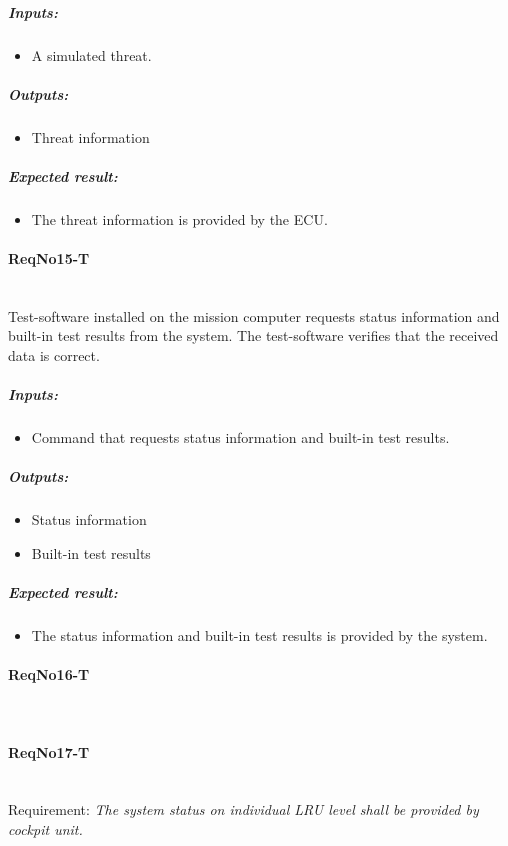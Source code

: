 	\subparagraph{Inputs:}
	\begin{itemize}
	\item A simulated threat. 
	\end{itemize}
	\subparagraph{Outputs:}
	\begin{itemize}
	\item Threat information
	\end{itemize}
	\subparagraph{Expected result:}
	\begin{itemize}
	\item The threat information is provided by the ECU.
	\end{itemize}
	

\paragraph{ReqNo15-T}\mbox{}\\ %
Test-software installed on the mission computer requests status information and built-in test results from the system. The test-software verifies that the received data is correct.
\\
	\subparagraph{Inputs:}
	\begin{itemize}
	\item Command that requests status information and built-in test results. 
	\end{itemize}
	\subparagraph{Outputs:}
	\begin{itemize}
	\item Status information
	\item Built-in test results
	\end{itemize}
	\subparagraph{Expected result:}
	\begin{itemize}
	\item The status information and built-in test results is provided by the system.
	\end{itemize}

\paragraph{ReqNo16-T}\mbox{}\\ %


\paragraph{ReqNo17-T}\mbox{}\\ %
Requirement: \textit{The system status on individual LRU level shall be provided by cockpit unit.}\\

